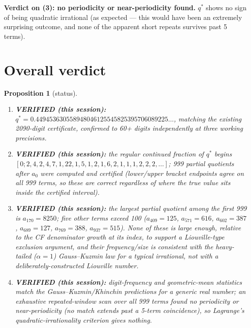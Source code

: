 \documentclass[11pt]{article}
\newtheorem{proposition}{Proposition}
\begin{document}
\textbf{Verdict on (3): no periodicity or near-periodicity found.} $q^\ast$ shows no sign of being
quadratic irrational (as expected --- this would have been an extremely surprising outcome, and
none of the apparent short repeats survives past 5 terms).

\section{Overall verdict}

\begin{proposition}[status]
\begin{enumerate}
\item[(a)] \textbf{VERIFIED (this session):} $q^\ast=0.449453630558948046125545825395706089225\ldots$,
matching the existing 2090-digit certificate, confirmed to 60+ digits independently at three
working precisions.
\item[(b)] \textbf{VERIFIED (this session):} the regular continued fraction of $q^\ast$ begins
$[0;2,4,2,4,7,1,22,1,5,1,2,1,6,2,1,1,1,2,2,2,\ldots]$; 999 partial quotients after $a_0$ were
computed and certified (lower/upper bracket endpoints agree on all 999 terms, so these are
correct regardless of where the true value sits inside the certified interval).
\item[(c)] \textbf{VERIFIED (this session):} the largest partial quotient among the first 999 is
$a_{170}=8250$; five other terms exceed 100 ($a_{409}=125$, $a_{571}=616$, $a_{602}=387$,
$a_{689}=127$, $a_{769}=388$, $a_{937}=515$). None of these is large enough, relative to the CF
denominator growth at its index, to support a Liouville-type exclusion argument, and their
frequency/size is consistent with the heavy-tailed ($\alpha=1$) Gauss--Kuzmin law for a typical
irrational, not with a deliberately-constructed Liouville number.
\item[(d)] \textbf{VERIFIED (this session):} digit-frequency and geometric-mean statistics match
the Gauss--Kuzmin/Khinchin predictions for a generic real number; an exhaustive repeated-window
scan over all 999 terms found no periodicity or near-periodicity (no match extends past a 5-term
coincidence), so Lagrange's quadratic-irrationality criterion gives nothing.
\end{enumerate}
\end{proposition}
\end{document}
